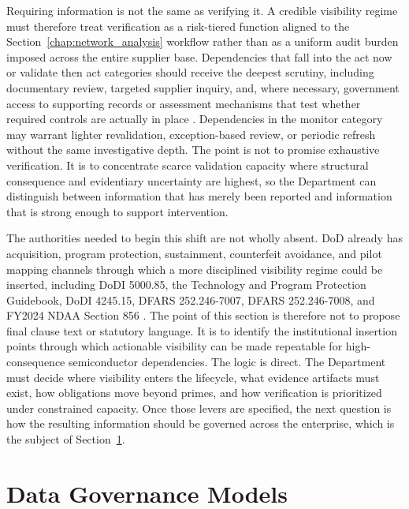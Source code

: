 Requiring information is not the same as verifying it. A credible visibility regime must therefore treat verification as a risk-tiered function aligned to the Section~\ref{chap:network_analysis} workflow rather than as a uniform audit burden imposed across the entire supplier base. Dependencies that fall into the act now or validate then act categories should receive the deepest scrutiny, including documentary review, targeted supplier inquiry, and, where necessary, government access to supporting records or assessment mechanisms that test whether required controls are actually in place \parencite{ch5_dfars2522047020,ch5_dfars2522467007}. Dependencies in the monitor category may warrant lighter revalidation, exception-based review, or periodic refresh without the same investigative depth. The point is not to promise exhaustive verification. It is to concentrate scarce validation capacity where structural consequence and evidentiary uncertainty are highest, so the Department can distinguish between information that has merely been reported and information that is strong enough to support intervention.

The authorities needed to begin this shift are not wholly absent. DoD already has acquisition, program protection, sustainment, counterfeit avoidance, and pilot mapping channels through which a more disciplined visibility regime could be inserted, including DoDI 5000.85, the Technology and Program Protection Guidebook, DoDI 4245.15, DFARS 252.246-7007, DFARS 252.246-7008, and FY2024 NDAA Section 856 \parencite{ch5_dodi500085,ch5_dodi424515,ch5_dfars2522467007,ch5_ndaa2024_sec856}. The point of this section is therefore not to propose final clause text or statutory language. It is to identify the institutional insertion points through which actionable visibility can be made repeatable for high-consequence semiconductor dependencies. The logic is direct. The Department must decide where visibility enters the lifecycle, what evidence artifacts must exist, how obligations move beyond primes, and how verification is prioritized under constrained capacity. Once those levers are specified, the next question is how the resulting information should be governed across the enterprise, which is the subject of Section~\ref{sec:ch5_data_governance_models}.

\section{Data Governance Models}
\label{sec:ch5_data_governance_models}

